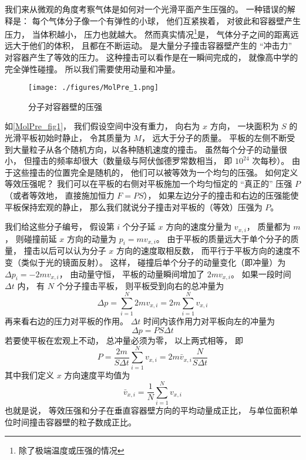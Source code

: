 

我们来从微观的角度考察气体是如何对一个光滑平面产生压强的。 一种错误的解释是： 每个气体分子像一个有弹性的小球， 他们互紧挨着， 对彼此和容器壁产生压力， 当体积越小， 压力也就越大。 然而真实情况\footnote{除了极端温度或压强的情况}是， 气体分子之间的距离远远大于他们的体积， 且都在不断运动。 是大量分子撞击容器壁产生的 “冲击力” 对容器产生了等效的压力。 这种撞击可以看作是在一瞬间完成的， 就像高中学的完全弹性碰撞。 所以我们需要使用动量和冲量。

\begin{figure}[ht]
\centering
\texttt{[image: ./figures/MolPre\_1.png]}
\caption{分子对容器壁的压强} \label{MolPre_fig1}
\end{figure}

如\autoref{MolPre_fig1}， 我们假设空间中没有重力， 向右为 $x$ 方向， 一块面积为 $S$ 的光滑平板初始时静止， 令其质量为 $M$， 远大于分子的质量。 平板的左侧不断受到大量粒子从各个随机方向，以各种随机速度的撞击。 虽然每个分子的动量很小， 但撞击的频率却很大（数量级与阿伏伽德罗常数相当， 即 $10^{24}$ 次每秒）。 由于这些撞击的位置完全是随机的， 他们可以被等效为一个均匀的压强。 如何定义等效压强呢？ 我们可以在平板的右侧对平板施加一个均匀恒定的 “真正的” 压强 $P$ （或者等效地， 直接施加恒力 $F = PS$）， 如果左边分子的撞击和右边的压强能使平板保持宏观的静止， 那么我们就说分子撞击对平板的（等效）压强为 $P$。

我们给这些分子编号， 假设第 $i$ 个分子延 $x$ 方向的速度分量为 $v_{x,i}$， 质量都为 $m$， 则碰撞前延 $x$ 方向的动量为 $p_i = m v_{x,i}$。 由于平板的质量远大于单个分子的质量， 撞击以后可以认为分子 $x$ 方向的速度取相反数， 而平行于平板方向的速度不变（类似于光的镜面反射）。 这样， 碰撞后单个分子的动量变化（即冲量）为 $\Delta p_i = -2mv_{x,i}$， 由动量守恒， 平板的动量瞬间增加了 $2mv_{x,i}$。 如果一段时间 $\Delta t$ 内， 有 $N$ 个分子撞击平板， 则平板受到向右的总冲量为
\begin{equation}
\Delta p = \sum_{i=1}^N 2mv_{x,i} = 2m \sum_{i=1}^N v_{x,i}
\end{equation}
再来看右边的压力对平板的作用。 $\Delta t$ 时间内该作用力对平板向左的冲量为
\begin{equation}\label{MolPre_eq1}
\Delta p = PS \Delta t
\end{equation}
若要使平板在宏观上不动， 总冲量必须为零， 以上两式相等， 即
\begin{equation}
P = \frac{2m}{S\Delta t} \sum_{i=1}^N v_{x,i} = 2m\bar v_{x,i} \frac{N}{S\Delta t}
\end{equation}
其中我们定义 $x$ 方向速度平均值为
\begin{equation}\label{MolPre_eq2}
\bar v_{x,i} = \frac{1}{N}\sum_{i=1}^N v_{x,i}
\end{equation}
也就是说， 等效压强和分子在垂直容器壁方向的平均动量成正比， 与单位面积单位时间撞击容器壁的粒子数成正比。

